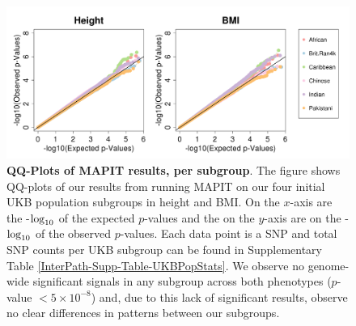 \documentclass[12pt,a4paper]{article}
\def\log{{\rm log}}
\begin{document}
\begin{figure}[htb]
\centering
\hspace*{-1.4cm}
\includegraphics[scale=.45]{Images/Main/InterPath_Main_Figure_MAPIT_vs4_HeightBMI.png}
\caption[TBD]{\textbf{QQ-Plots of MAPIT results, per subgroup}. The figure shows QQ-plots of our results from running MAPIT on our four initial UKB population subgroups in height and BMI. On the $x$-axis are the -$\log_{10}$ of the expected $p$-values and the on the $y$-axis are on the -$\log_{10}$ of the observed $p$-values. Each data point is a SNP and total SNP counts per UKB subgroup can be found in Supplementary Table \ref{InterPath-Supp-Table-UKBPopStats}. We observe no genome-wide significant signals in any subgroup across both phenotypes ($p$-value $< 5\times10^{-8}$) and, due to this lack of significant results, observe no clear differences in patterns between our subgroups.}
\label{InterPath-Supp-Figure-MAPIT-HeightBMI}
\end{figure}

%
\end{document}

